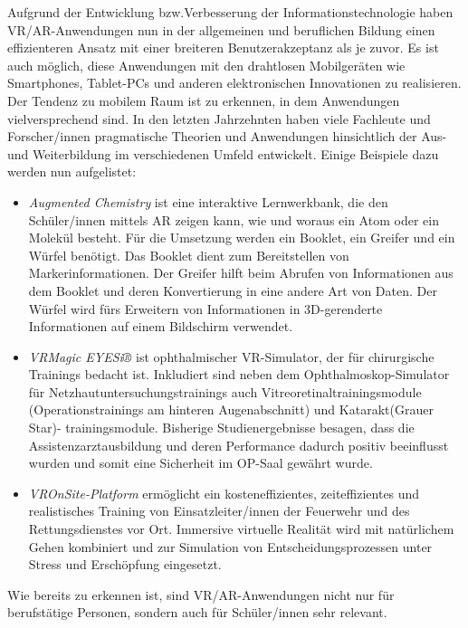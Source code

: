 \documentclass[deutsch]{llncs}
\begin{document}
Aufgrund der Entwicklung bzw.Verbesserung der Informationstechnologie haben VR/AR-Anwendungen nun in der allgemeinen und beruflichen Bildung einen effizienteren Ansatz mit einer breiteren Benutzerakzeptanz als je zuvor. Es ist auch möglich, diese Anwendungen mit den drahtlosen Mobilgeräten wie Smartphones, Tablet-PCs und anderen elektronischen Innovationen zu realisieren. Der Tendenz zu mobilem Raum ist zu erkennen, in dem Anwendungen vielversprechend sind.
In den letzten Jahrzehnten haben viele Fachleute und Forscher/innen pragmatische Theorien und Anwendungen hinsichtlich der Aus- und Weiterbildung im verschiedenen Umfeld entwickelt. Einige Beispiele dazu werden nun aufgelistet:
\begin{itemize}
\item \emph{Augmented Chemistry} ist eine interaktive Lernwerkbank, die den Schüler/innen mittels AR zeigen kann, wie und woraus ein Atom oder ein Molekül besteht. Für die Umsetzung werden ein Booklet, ein Greifer und ein Würfel benötigt. Das Booklet dient zum Bereitstellen von Markerinformationen. Der Greifer hilft beim Abrufen von Informationen aus dem Booklet und deren Konvertierung in eine andere Art von Daten. Der Würfel wird fürs Erweitern von Informationen in 3D-gerenderte Informationen auf einem Bildschirm verwendet.
\item \emph{VRMagic EYESi®} ist ophthalmischer VR-Simulator, der für chirurgische Trainings bedacht ist. Inkludiert sind neben dem Ophthalmoskop-Simulator für Netzhautuntersuchungstrainings auch Vitreoretinaltrainingsmodule (Operationstrainings am hinteren Augenabschnitt) und Katarakt(Grauer Star)- trainingsmodule. Bisherige Studienergebnisse besagen, dass die Assistenzarztausbildung und deren Performance dadurch positiv beeinflusst wurden und somit eine Sicherheit im OP-Saal gewährt wurde. 
\item \emph{VROnSite-Platform} ermöglicht ein kosteneffizientes, zeiteffizientes und realistisches Training von Einsatzleiter/innen der Feuerwehr und des Rettungsdienstes vor Ort. Immersive virtuelle Realität wird mit natürlichem Gehen kombiniert und zur Simulation von Entscheidungsprozessen unter Stress und Erschöpfung eingesetzt. 
\end{itemize}
Wie bereits zu erkennen ist, sind VR/AR-Anwendungen nicht nur für berufstätige Personen, sondern auch für Schüler/innen sehr relevant. 
\end{document}
